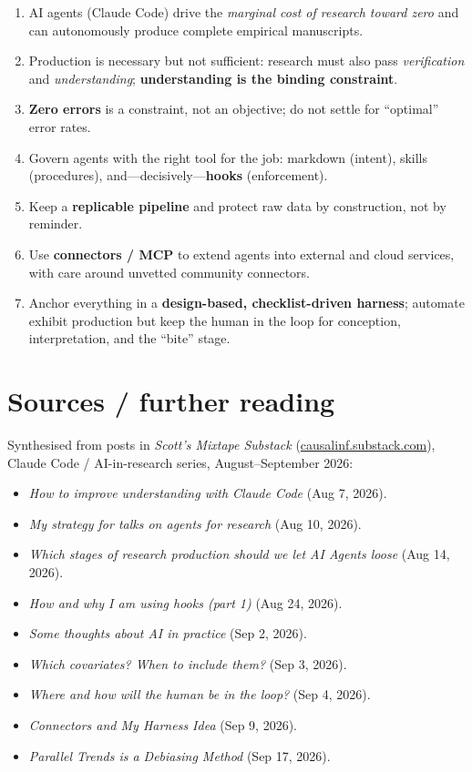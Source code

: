 \documentclass[11pt]{article}
\begin{document}
\begin{enumerate}[leftmargin=1.8em]
  \item AI agents (Claude Code) drive the \emph{marginal cost of research toward
  zero} and can autonomously produce complete empirical manuscripts.
  \item Production is necessary but not sufficient: research must also pass
  \emph{verification} and \emph{understanding}; \textbf{understanding is the
  binding constraint}.
  \item \textbf{Zero errors} is a constraint, not an objective; do not settle for
  ``optimal'' error rates.
  \item Govern agents with the right tool for the job: markdown (intent), skills
  (procedures), and---decisively---\textbf{hooks} (enforcement).
  \item Keep a \textbf{replicable pipeline} and protect raw data by construction,
  not by reminder.
  \item Use \textbf{connectors / MCP} to extend agents into external and cloud
  services, with care around unvetted community connectors.
  \item Anchor everything in a \textbf{design-based, checklist-driven harness};
  automate exhibit production but keep the human in the loop for conception,
  interpretation, and the ``bite'' stage.
\end{enumerate}

\section*{Sources / further reading}
\noindent Synthesised from posts in \emph{Scott's Mixtape Substack}
(\href{https://causalinf.substack.com/}{causalinf.substack.com}),
Claude Code / AI-in-research series, August--September 2026:

\begin{itemize}[leftmargin=1.6em, itemsep=1pt]
  \item \emph{How to improve understanding with Claude Code} (Aug 7, 2026).
  \item \emph{My strategy for talks on agents for research} (Aug 10, 2026).
  \item \emph{Which stages of research production should we let AI Agents loose}
  (Aug 14, 2026).
  \item \emph{How and why I am using hooks (part 1)} (Aug 24, 2026).
  \item \emph{Some thoughts about AI in practice} (Sep 2, 2026).
  \item \emph{Which covariates? When to include them?} (Sep 3, 2026).
  \item \emph{Where and how will the human be in the loop?} (Sep 4, 2026).
  \item \emph{Connectors and My Harness Idea} (Sep 9, 2026).
  \item \emph{Parallel Trends is a Debiasing Method} (Sep 17, 2026).
\end{itemize}
\end{document}
